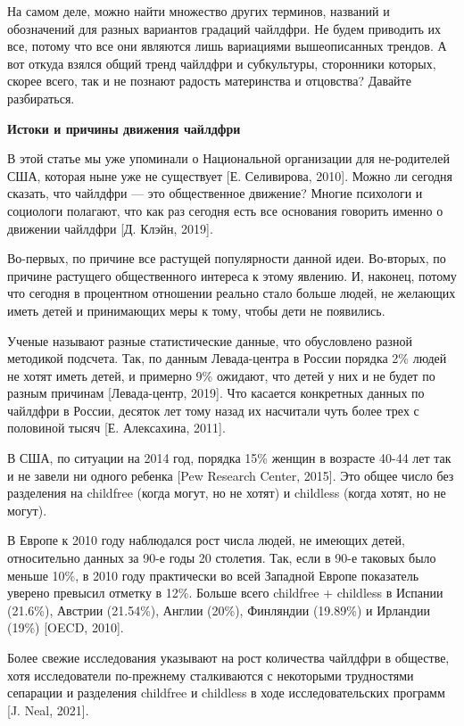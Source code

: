 На самом деле, можно найти множество других терминов, названий и обозначений для разных вариантов градаций чайлдфри. Не будем приводить их все, потому что все они являются лишь вариациями вышеописанных трендов. А вот откуда взялся общий тренд чайлдфри и субкультуры, сторонники которых, скорее всего, так и не познают радость материнства и отцовства? Давайте разбираться.

\textbf{Истоки и причины движения чайлдфри}

В этой статье мы уже упоминали о Национальной организации для не-родителей США, которая ныне уже не существует [Е. Селивирова, 2010]. Можно ли сегодня сказать, что чайлдфри --- это общественное движение? Многие психологи и социологи полагают, что как раз сегодня есть все основания говорить именно о движении чайлдфри [Д. Клэйн, 2019].

Во-первых, по причине все растущей популярности данной идеи. Во-вторых, по причине растущего общественного интереса к этому явлению. И, наконец, потому что сегодня в процентном отношении реально стало больше людей, не желающих иметь детей и принимающих меры к тому, чтобы дети не появились.

Ученые называют разные статистические данные, что обусловлено разной методикой подсчета. Так, по данным Левада-центра в России порядка 2\% людей не хотят иметь детей, и примерно 9\% ожидают, что детей у них и не будет по разным причинам [Левада-центр, 2019]. Что касается конкретных данных по чайлдфри в России, десяток лет тому назад их насчитали чуть более трех с половиной тысяч [Е. Алексахина, 2011].

В США, по ситуации на 2014 год, порядка 15\% женщин в возрасте 40-44 лет так и не завели ни одного ребенка [Pew Research Center, 2015]. Это общее число без разделения на childfree (когда могут, но не хотят) и childless (когда хотят, но не могут).

В Европе к 2010 году наблюдался рост числа людей, не имеющих детей, относительно данных за 90-е годы 20 столетия. Так, если в 90-е таковых было меньше 10\%, в 2010 году практически во всей Западной Европе показатель уверено превысил отметку в 12\%. Больше всего childfree + childless в Испании (21.6\%), Австрии (21.54\%), Англии (20\%), Финляндии (19.89\%) и Ирландии (19\%) [OECD, 2010].

Более свежие исследования указывают на рост количества чайлдфри в обществе, хотя исследователи по-прежнему сталкиваются с некоторыми трудностями сепарации и разделения childfree и childless в ходе исследовательских программ [J. Neal, 2021].

